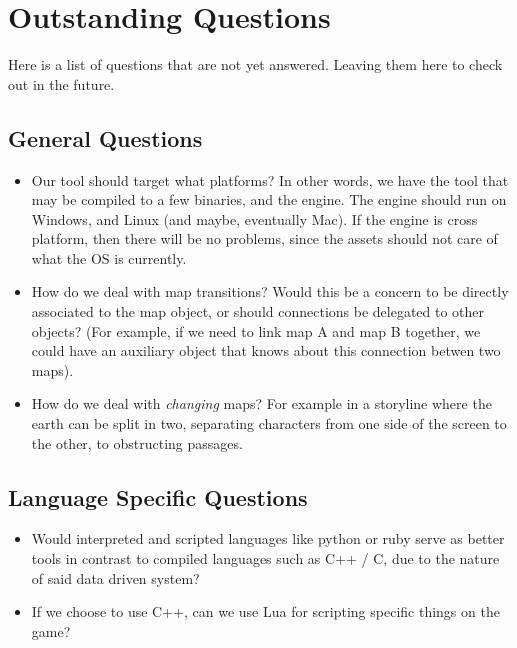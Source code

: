 \section{Outstanding Questions}

Here is a list of questions that are not yet answered. Leaving them here to
check out in the future.

\subsection{General Questions}

\begin{itemize}
  \item Our tool should target what platforms? In other words, we have the tool
    that may be compiled to a few binaries, and the engine. The engine should
    run on Windows, and Linux (and maybe, eventually Mac). If the engine is
    cross platform, then there will be no problems, since the assets should not
    care of what the OS is currently.

  \item How do we deal with map transitions? Would this be a concern to be
    directly associated to the map object, or should connections be delegated to
    other objects? (For example, if we need to link map A and map B together, we
      could have an auxiliary object that knows about this connection betwen two
    maps).

  \item How do we deal with \textit{changing} maps? For example in a storyline
    where the earth can be split in two, separating characters from one side of
    the screen to the other, to obstructing passages.

\end{itemize}

\subsection{Language Specific Questions}

\begin{itemize}

\item Would interpreted and scripted languages like python or ruby serve as
better tools in contrast to compiled languages such as C++ / C, due to the
nature of said data driven system?

\item If we choose to use C++, can we use Lua for scripting specific things on
the game?

\end{itemize}

